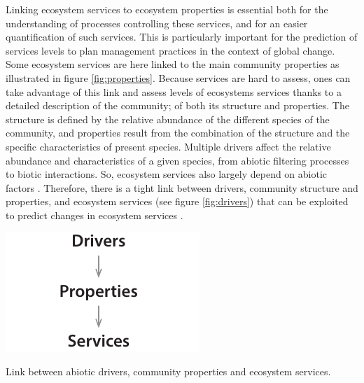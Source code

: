 Linking ecosystem services to ecosystem properties is essential both for the understanding of processes controlling these services, and for an easier quantification of such services. This is particularly important for the prediction of services levels to plan management practices in the context of global change. Some ecosystem services are here linked to the main community properties as illustrated in figure  \ref{fig:properties}. Because services are hard to assess, ones can take advantage of this link and assess levels of ecosystems services thanks to a detailed description of the community; of both its structure and properties. The structure is defined by the relative abundance of the different species of the community, and properties result from the combination of the structure and the specific characteristics of present species. Multiple drivers affect the relative abundance and characteristics of a given species, from abiotic filtering processes to biotic interactions. So, ecosystem services also largely depend on abiotic factors \parencite{lavorel_predicting_2002}. Therefore, there is a tight link between drivers, community structure and properties, and ecosystem services (see figure \ref{fig:drivers}) that can be exploited to predict changes in ecosystem services \parencite{lamarque_plant_2014}. 


\begin{marginfigure}
    \includegraphics{./1_Introduction/graphics/drivers_properties_services_m.pdf}
  \caption[Drivers to services]{Link between abiotic drivers, community properties and ecosystem services.}
  \label{fig:drivers}
\end{marginfigure}


